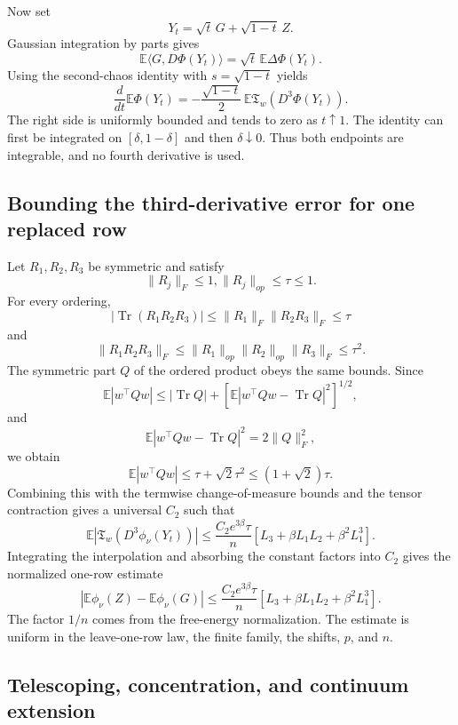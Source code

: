 \documentclass[11pt]{article}
\numberwithin{equation}{section}
\theoremstyle{definition}
\theoremstyle{remark}
\newcommand{\E}{\mathbb E}
\newcommand{\1}{\boldsymbol 1}
\begin{document}
\begin{aiblock}
Now set
\[
    Y_t = \sqrt{t} \, G + \sqrt{1 - t} \, Z.
\]
Gaussian integration by parts gives
\[
    \E\langle G, D\Phi(Y_t) \rangle = \sqrt{t} \, \E\Delta\Phi(Y_t).
\]
Using the second-chaos identity with $s = \sqrt{1 - t}$ yields
\[
    \frac d{dt}\E\Phi(Y_t) = -\frac{\sqrt{1 - t}}{2} \, \E\mathfrak T_w(D^3\Phi(Y_t)).
\]
The right side is uniformly bounded and tends to zero as $t \uparrow 1$. The identity can first be integrated on $[\delta, 1 - \delta]$ and then  $\delta \downarrow 0$. Thus both endpoints are integrable, and no fourth derivative is used.



\subsection{Bounding the third-derivative error for one replaced row}\label{fixed-triple-contraction-and-the-one-row-bound}

Let $R_1, R_2, R_3$ be symmetric and satisfy
\[
    \|R_j\|_F \le 1, \|R_j\|_{op} \le \tau \le 1.
\]
For every ordering,
\[
    |\operatorname{Tr}(R_1 R_2 R_3)| \le \|R_1\|_F \|R_2 R_3\|_F \le \tau
\]
and
\[
  \|R_1 R_2 R_3\|_F \le \|R_1\|_{op} \|R_2\|_{op} \|R_3\|_F \le \tau^2.
\]
The symmetric part $Q$ of the ordered product obeys the same bounds. Since
\[
    \E|w^\top Q w| \le |\operatorname{Tr}Q| + [\E|w^\top Q w - \operatorname{Tr}Q|^2]^{1/2},
\]
and
\[
    \E|w^\top Q w - \operatorname{Tr}Q|^2 = 2\|Q\|_F^2,
\]
we obtain
\[
    \E|w^\top Q w| \le \tau + \sqrt{2} \tau^2 \le (1 + \sqrt{2}) \tau.
\]
Combining this with the termwise change-of-measure bounds and the tensor contraction gives a universal $C_2$ such that
\[
    \E|\mathfrak T_w(D^3\phi_\nu(Y_t))| \le \frac{C_2 e^{3\beta}\tau}{n} [L_3 + \beta L_1 L_2 + \beta^2 L_1^3].
\]
Integrating the interpolation and absorbing the constant factors into $C_2$ gives the normalized one-row estimate
\[
    |\E\phi_\nu(Z) - \E\phi_\nu(G)| \le \frac{C_2 e^{3\beta} \tau}{n} [L_3 + \beta L_1 L_2 + \beta^2 L_1^3].
\]
The factor $1/n$ comes from the free-energy normalization. The estimate is uniform in the leave-one-row law, the finite family, the shifts, $p$, and $n$.

\subsection{Telescoping, concentration, and continuum extension}\label{telescoping-concentration-and-continuum-extension}


\end{aiblock}
\end{document}

